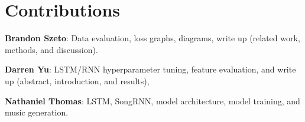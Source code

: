 \section*{Contributions}

\textbf{Brandon Szeto}: Data evaluation, loss graphs, diagrams, write up (related work, methods, and discussion).

\textbf{Darren Yu}: LSTM/RNN hyperparameter tuning, feature evaluation, and write up (abstract, introduction, and results), 

\textbf{Nathaniel Thomas}: LSTM, SongRNN, model architecture, model training, and music generation.
